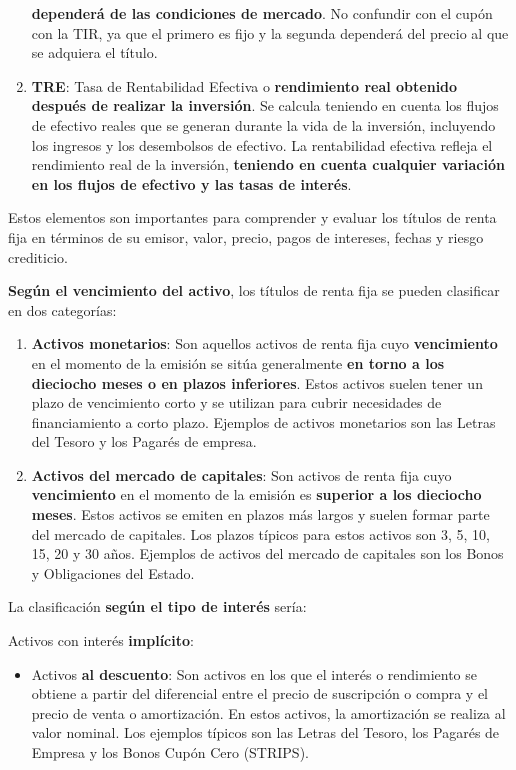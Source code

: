\documentclass[
  letterpaper,
  DIV=11,
  numbers=noendperiod]{scrartcl}
\providecommand{\tightlist}{%
  \setlength{\itemsep}{0pt}\setlength{\parskip}{0pt}}\usepackage{longtable,booktabs,array}
\begin{document}
\begin{enumerate}
  \textbf{dependerá de las condiciones de mercado}. No confundir con el
  cupón con la TIR, ya que el primero es fijo y la segunda dependerá del
  precio al que se adquiera el título.
\item
  \textbf{TRE}: Tasa de Rentabilidad Efectiva o \textbf{rendimiento real
  obtenido después de realizar la inversión}. Se calcula teniendo en
  cuenta los flujos de efectivo reales que se generan durante la vida de
  la inversión, incluyendo los ingresos y los desembolsos de efectivo.
  La rentabilidad efectiva refleja el rendimiento real de la inversión,
  \textbf{teniendo en cuenta cualquier variación en los flujos de
  efectivo y las tasas de interés}.
\end{enumerate}

Estos elementos son importantes para comprender y evaluar los títulos de
renta fija en términos de su emisor, valor, precio, pagos de intereses,
fechas y riesgo crediticio.

\textbf{Según el vencimiento del activo}, los títulos de renta fija se
pueden clasificar en dos categorías:

\begin{enumerate}
\def\labelenumi{\arabic{enumi}.}
\item
  \textbf{Activos monetarios}: Son aquellos activos de renta fija cuyo
  \textbf{vencimiento} en el momento de la emisión se sitúa generalmente
  \textbf{en torno a los dieciocho meses o en plazos inferiores}. Estos
  activos suelen tener un plazo de vencimiento corto y se utilizan para
  cubrir necesidades de financiamiento a corto plazo. Ejemplos de
  activos monetarios son las Letras del Tesoro y los Pagarés de empresa.
\item
  \textbf{Activos del mercado de capitales}: Son activos de renta fija
  cuyo \textbf{vencimiento} en el momento de la emisión es
  \textbf{superior a los dieciocho meses}. Estos activos se emiten en
  plazos más largos y suelen formar parte del mercado de capitales. Los
  plazos típicos para estos activos son 3, 5, 10, 15, 20 y 30 años.
  Ejemplos de activos del mercado de capitales son los Bonos y
  Obligaciones del Estado.
\end{enumerate}

La clasificación \textbf{según el tipo de interés} sería:

Activos con interés \textbf{implícito}:

\begin{itemize}
\tightlist
\item
  Activos \textbf{al descuento}: Son activos en los que el interés o
  rendimiento se obtiene a partir del diferencial entre el precio de
  suscripción o compra y el precio de venta o amortización. En estos
  activos, la amortización se realiza al valor nominal. Los ejemplos
  típicos son las Letras del Tesoro, los Pagarés de Empresa y los Bonos
  Cupón Cero (STRIPS).
\end{itemize}
\end{document}
